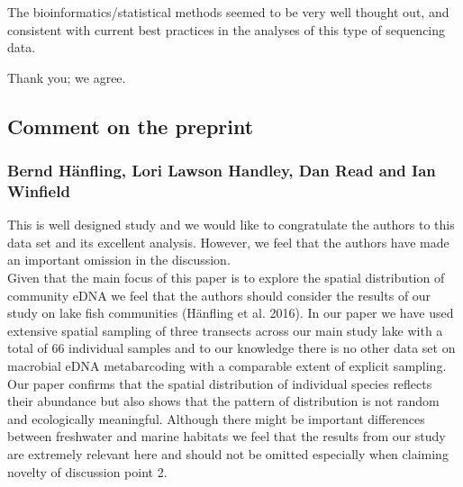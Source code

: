 \documentclass{article}
\newenvironment{response}
	{
	\begin{adjustwidth}{1cm}{0cm}
	\color{peerjBlue}
	}
	{
	\end{adjustwidth}
	}
\begin{document}
The bioinformatics/statistical methods seemed to be very well thought out, and consistent with current best practices in the analyses of this type of sequencing data.
\begin{response}
	Thank you; we agree.\\
\end{response}


\subsection*{Comment on the preprint}

\subsubsection*{Bernd Hänfling, Lori Lawson Handley, Dan Read and Ian Winfield}

This is well designed study and we would like to congratulate the authors to this data set and its excellent analysis. However, we feel that the authors have made an important omission in the discussion.\\


Given that the main focus of this paper is to explore the spatial distribution of community eDNA we feel that the authors should consider the results of our study on lake fish communities (Hänfling et al. 2016). In our paper we have used extensive spatial sampling of three transects across our main study lake with a total of 66 individual samples and to our knowledge there is no other data set on macrobial eDNA metabarcoding with a comparable extent of explicit sampling. Our paper confirms that the spatial distribution of individual species reflects their abundance but also shows that the pattern of distribution is not random and ecologically meaningful. Although there might be important differences between freshwater and marine habitats we feel that the results from our study are extremely relevant here and should not be omitted especially when claiming novelty of discussion point 2.\\
\end{document}
